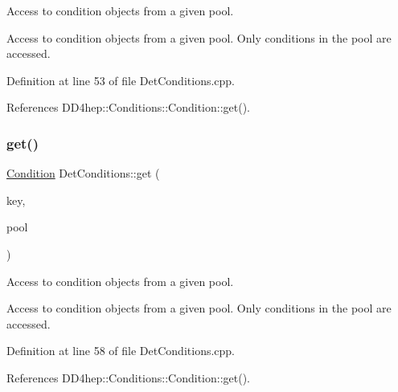 Access to condition objects from a given pool. 

Access to condition objects from a given pool. Only conditions in the pool are accessed. 

Definition at line 53 of file Det\+Conditions.\+cpp.



References D\+D4hep\+::\+Conditions\+::\+Condition\+::get().

\hypertarget{class_d_d4hep_1_1_conditions_1_1_det_conditions_a4c19cc72b89329e39cd0123229cba3d0}{}\label{class_d_d4hep_1_1_conditions_1_1_det_conditions_a4c19cc72b89329e39cd0123229cba3d0} 
\subsubsection{\texorpdfstring{get()}{get()}\hspace{0.1cm}{\footnotesize\ttfamily [2/4]}}
{\footnotesize\ttfamily \hyperlink{class_d_d4hep_1_1_conditions_1_1_condition}{Condition} Det\+Conditions\+::get (\begin{DoxyParamCaption}\item[{\hyperlink{class_d_d4hep_1_1_conditions_1_1_condition_a7528efa762e8cc072ef80ea67c3531f9}{Condition\+::key\+\_\+type}}]{key,  }\item[{const \hyperlink{class_d_d4hep_1_1_conditions_1_1_user_pool}{User\+Pool} \&}]{pool }\end{DoxyParamCaption})}



Access to condition objects from a given pool. 

Access to condition objects from a given pool. Only conditions in the pool are accessed. 

Definition at line 58 of file Det\+Conditions.\+cpp.



References D\+D4hep\+::\+Conditions\+::\+Condition\+::get().

\hypertarget{class_d_d4hep_1_1_conditions_1_1_det_conditions_a0bb1e77e051b8fc167a54dadbed90ca1}{}\label{class_d_d4hep_1_1_conditions_1_1_det_conditions_a0bb1e77e051b8fc167a54dadbed90ca1} 
